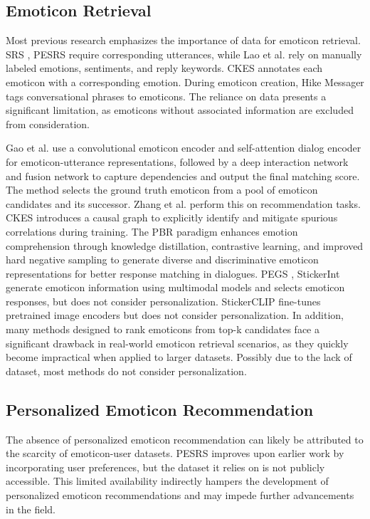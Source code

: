 \subsection{Emoticon Retrieval}
Most previous research emphasizes the importance of data for emoticon retrieval. SRS \cite{learning-to-respond-with-stickers-2020}, PESRS \cite{learning-to-respond-2021} require corresponding utterances, while Lao et al. \cite{practical-sticker} rely on manually labeled emotions, sentiments, and reply keywords. CKES \cite{chen2024deconfounded} annotates each emoticon with a corresponding emotion. During emoticon creation, Hike Messager \cite{laddha2020understanding} tags conversational phrases to emoticons. The reliance on data presents a significant limitation, as emoticons without associated information are excluded from consideration.

Gao et al. \cite{learning-to-respond-with-stickers-2020} use a convolutional emoticon encoder and self-attention dialog encoder for emoticon-utterance representations, followed by a deep interaction network and fusion network to capture dependencies and output the final matching score. The method selects the ground truth emoticon from a pool of emoticon candidates and its successor. Zhang et al. \cite{zhang-etal-2022-selecting} perform this on recommendation tasks. CKES \cite{chen2024deconfounded} introduces a causal graph to explicitly identify and mitigate spurious correlations during training. The PBR \cite{xia2024perceive} paradigm enhances emotion comprehension through knowledge distillation, contrastive learning, and improved hard negative sampling to generate diverse and discriminative emoticon representations for better response matching in dialogues. PEGS \cite{zhang2024stickerconv}, StickerInt \cite{stickerint} generate emoticon information using multimodal models and selects emoticon responses, but does not consider personalization. StickerCLIP \cite{stickerclip} fine-tunes pretrained image encoders but does not consider personalization. In addition, many methods designed to rank emoticons from top-k candidates face a significant drawback in real-world emoticon retrieval scenarios, as they quickly become impractical when applied to larger datasets. Possibly due to the lack of dataset, most methods do not consider personalization.

\subsection{Personalized Emoticon Recommendation}
The absence of personalized emoticon recommendation can likely be attributed to the scarcity of emoticon-user datasets. PESRS \cite{learning-to-respond-2021} improves upon earlier work \cite{learning-to-respond-with-stickers-2020} by incorporating user preferences, but the dataset it relies on is not publicly accessible. This limited availability indirectly hampers the development of personalized emoticon recommendations and may impede further advancements in the field.


